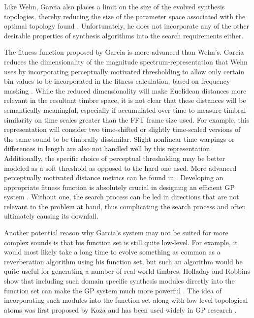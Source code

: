 \documentclass[a4paper,12pt]{report} 	%
\numberwithin{figure}{chapter}
\numberwithin{table}{chapter}
\numberwithin{equation}{chapter}
\begin{document}
\begin{flushleft}
Like Wehn, Garcia also places a limit on the size of the evolved synthesis topologies, thereby reducing the size of the parameter space associated with the optimal topology found \cite[p. 87]{Garcia:2001jw}. Unfortunately, he does not incorporate any of the other desirable properties of synthesis algorithms into the search requirements either.

The fitness function proposed by Garcia is more advanced than Wehn's. Garcia reduces the dimensionality of the magnitude spectrum-representation that Wehn uses by incorporating perceptually motivated thresholding to allow only certain bin values to be incorporated in the fitness calculation, based on frequency masking \cite[p. 6]{Garcia:2002cq}. While the reduced dimensionality will make Euclidean distances more relevant in the resultant timbre space, it is not clear that these distances will be semantically meaningful, especially if accumulated over time to measure timbral similarity on time scales greater than the FFT frame size used. For example, this representation will consider two time-shifted or slightly time-scaled versions of the same sound to be timbrally dissimilar. Slight nonlinear time warpings or differences in length are also not handled well by this representation. Additionally, the specific choice of perceptual thresholding may be better modeled as a soft threshold as opposed to the hard one used. More advanced perceptually motivated distance metrics can be found in \cite{Riionheimo:2003qo, Jehan:2005fy}. Developing an appropriate fitness function is absolutely crucial in designing an efficient GP system \cite[p. 3]{McDermott:2006ud}. Without one, the search process can be led in directions that are not relevant to the problem at hand, thus complicating the search process and often ultimately causing its downfall.

Another potential reason why Garcia's system may not be suited for more complex sounds is that his function set is still quite low-level. For example, it would most likely take a long time to evolve something as common as a reverberation algorithm using his function set, but such an algorithm would be quite useful for generating a number of real-world timbres. Holladay and Robbins show that including such domain specific synthesis modules directly into the function set can make the GP system much more powerful \cite[p. 4]{Holladay:2007ct}. The idea of incorporating such modules into the function set along with low-level topological atoms was first proposed by Koza and has been used widely in GP research \cite{Koza:1992gp}.


\end{flushleft}
\end{document}
